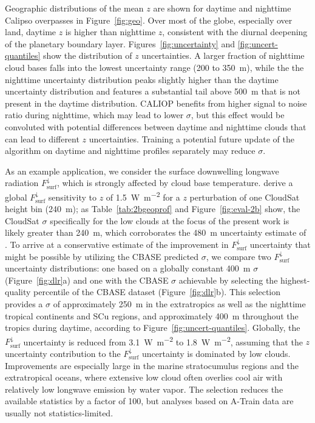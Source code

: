 \documentclass[essd,manuscript]{copernicus}\usepackage[]{graphicx}\usepackage[]{color}
\newcommand\CBH{\ensuremath{z}}
\newcommand\DLR{\ensuremath{F_\text{surf}^\downarrow}}
\begin{document}
Geographic distributions of the mean \CBH{} are shown for daytime and nighttime
Calipso overpasses in Figure~\ref{fig:geo}.  Over most of the globe, especially
over land, daytime \CBH{} is higher than nighttime \CBH{}, consistent with the
diurnal deepening of the planetary boundary layer.
Figures~\ref{fig:uncertainty} and \ref{fig:uncert-quantiles} show the
distribution of \CBH{} uncertainties.  A larger fraction of nighttime cloud
bases falls into the lowest uncertainty range (200 to 350~\unit{m}), while the
the nighttime uncertainty distribution peaks slightly higher than the daytime
uncertainty distribution and features a substantial tail above 500~\unit{m} that
is not present in the daytime distribution.  CALIOP benefits from higher signal
to noise ratio during nighttime, which may lead to lower $\sigma$, but this
effect would be convoluted with potential differences between daytime and
nighttime clouds that can lead to different \CBH{} uncertainties.  Training a
potential future update of the algorithm on daytime and nighttime profiles
separately may reduce $\sigma$.

As an example application, we consider the surface downwelling longwave
radiation \DLR{}, which is strongly affected by cloud base temperature.
\cite{Henderson2013} derive a global \DLR{} sensitivity to \CBH{} of
1.5~\unit{W~m^{-2}} for a \CBH{} perturbation of one CloudSat height bin
(240~\unit{m}); as Table~\ref{tab:2bgeoprof} and Figure~\ref{fig:eval-2b} show,
the CloudSat $\sigma$ specifically for the low clouds at the focus of the
present work is likely greater than 240~\unit{m}, which corroborates the
480~\unit{m} uncertainty estimate of \cite{Kato2011}. To arrive at a
conservative estimate of the improvement in \DLR{} uncertainty that might be
possible by utilizing the CBASE predicted $\sigma$, we compare two \DLR{}
uncertainty distributions: one based on a globally constant 400~\unit{m} $\sigma$
(Figure~\ref{fig:dlr}a) and one with the CBASE $\sigma$ achievable by selecting
the highest-quality percentile of the CBASE dataset
(Figure~\ref{fig:dlr}b). This selection provides a $\sigma$ of approximately
250~\unit{m} in the extratropics as well as the nighttime tropical continents
and SCu regions, and approximately 400~\unit{m} throughout the tropics during
daytime, according to Figure~\ref{fig:uncert-quantiles}.  Globally, the \DLR{}
uncertainty is reduced from 3.1~\unit{W~m^{-2}} to 1.8~\unit{W~m^{-2}}, assuming
that the \CBH{} uncertainty contribution to the \DLR{} uncertainty is dominated
by low clouds.  Improvements are especially large in the marine stratocumulus
regions and the extratropical oceans, where extensive low cloud often overlies
cool air with relatively low longwave emission by water vapor. The selection
reduces the available statistics by a factor of 100, but analyses based on
A-Train data are usually not statistics-limited.
\end{document}
